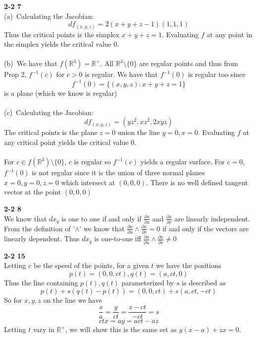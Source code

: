 \documentclass[12pt]{article}
\newenvironment{ques}[1]{\textbf{#1}\vspace{1 mm}\\ }{\bigskip}
\theoremstyle{definition}
\newcommand{\R}{\mathbb R}
\begin{document}
\begin{ques}{2-2 7}
	(a)\ Calculating the Jacobian:
	$$
	df_{(x,y,z)} = 2(x + y + z - 1)(1,1,1)
	$$
	Thus the critical points is the simplex $x + y + z = 1$. Evaluating $f$ at
	any point in the simplex yields the critical value $0$.\\
	\\
	(b)\ We have that $f(\R^3) = \R^+$. All $\R^3 \setminus \{0\}$ are regular
	points and thus from Prop 2, $f^{-1}(c)$ for $c > 0$ is regular. We have
	that $f^{-1}(0)$ is regular too since
	$$f^{-1}(0) = \{(x,y,z): x + y + z = 1\}$$
	is a plane (which we know is regular)
	\\
	\\
	(c)\ Calculating the Jacobian:
	$$
	df_{(x,y,z)} = (yz^2, xz^2, 2xyz)
	$$
	The critical points is the plane $z = 0$ union the line $y = 0, x = 0$.
	Evaluating $f$ at any critical point yields the critical value $0$.\\
	\\
	For $c \in f(\R^3) \setminus \{0\}$, $c$ is regular so $f^{-1}(c)$ yields a
	regular surface. For $c = 0$, $f^{-1}(0)$ is not regular since it is the
	union of three normal planes $x = 0, y = 0, z = 0$ which intersect at
	$(0,0,0)$. There is no well defined tangent vector at the point $(0,0,0)$

\end{ques}

\begin{ques}{2-2 8}
	We know that $dx_q$ is one to one if and only if $\frac{\partial
	x}{\partial u}$ and $\frac{\partial x}{\partial v}$ are linearly
	independent. From the definition of '$\wedge$' we know that $\frac{\partial
	x}{\partial u} \wedge \frac{\partial x}{\partial v} = 0$ if and only if the
	vectors are linearly dependent. Thus $dx_q$ is one-to-one iff $\frac{\partial
	x}{\partial u} \wedge \frac{\partial x}{\partial v} \neq 0$
\end{ques}

\begin{ques}{2-2 15}
	Letting $c$ be the speed of the points, for a given $t$ we have the positions
	$$p(t) = (0,0,ct), q(t) = (a,ct,0)$$
	Thus the line containing $p(t),q(t)$ parameterized by $s$ is described as
	$$p(t) + s(q(t) - p(t)) = (0,0,ct) + s(a,ct,-ct)$$
	So for $x,y,z$ on the line we have
	$$\frac x a = \frac{y}{ct} = \frac{z - ct}{-ct} = s$$
	$$ct x = a y = act - az$$
	Letting $t$ vary in $\R^+$, we will show this is the same set as $y(x-a) +
	zx = 0$. \\
\end{ques}
\end{document}
